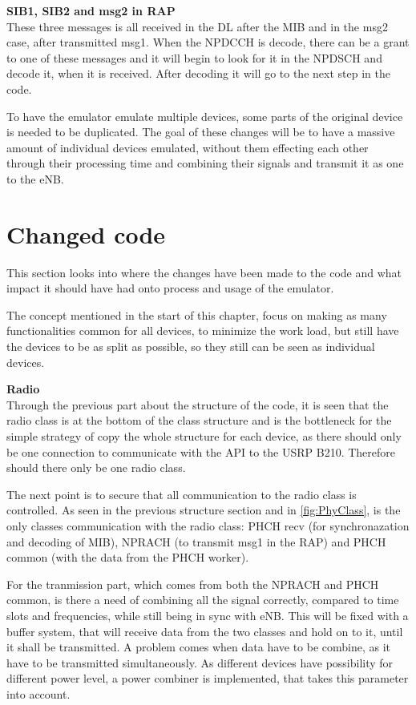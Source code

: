 \textbf{SIB1, SIB2 and msg2 in RAP} \\
These three messages is all received in the DL after the MIB and in the msg2 case, after transmitted msg1. When the NPDCCH is decode, there can be a grant to one of these messages and it will begin to look for it in the NPDSCH and decode it, when it is received. After decoding it will go to the next step in the code.







To have the emulator emulate multiple devices, some parts of the original device is needed to be duplicated. The goal of these changes will be to have a massive amount of individual devices emulated, without them effecting each other through their processing time and combining their signals and transmit it as one to the eNB.

\section{Changed code}
\label{sec:Changes}
This section looks into where the changes have been made to the code and what impact it should have had onto process and usage of the emulator.

The concept mentioned in the start of this chapter, focus on making as many functionalities common for all devices, to minimize the work load, but still have the devices to be as split as possible, so they still can be seen as individual devices.

\textbf{Radio}\\
Through the previous part about the structure of the code, it is seen that the radio class is at the bottom of the class structure and is the bottleneck for the simple strategy of copy the whole structure for each device, as there should only be one connection to communicate with the API to the USRP B210. Therefore should there only be one radio class.

The next point is to secure that all communication to the radio class is controlled. As seen in the previous structure section and in \autoref{fig:PhyClass}, is the only classes communication with the radio class: PHCH recv (for synchronazation and decoding of MIB), NPRACH (to transmit msg1 in the RAP) and PHCH common (with the data from the PHCH worker).

For the tranmission part, which comes from both the NPRACH and PHCH common, is there a need of combining all the signal correctly, compared to time slots and frequencies, while still being in sync with eNB. This will be fixed with a buffer system, that will receive data from the two classes and hold on to it, until it shall be transmitted. A problem comes when data have to be combine, as it have to be transmitted simultaneously. As different devices have possibility for different power level, a power combiner is implemented, that takes this parameter into account.

